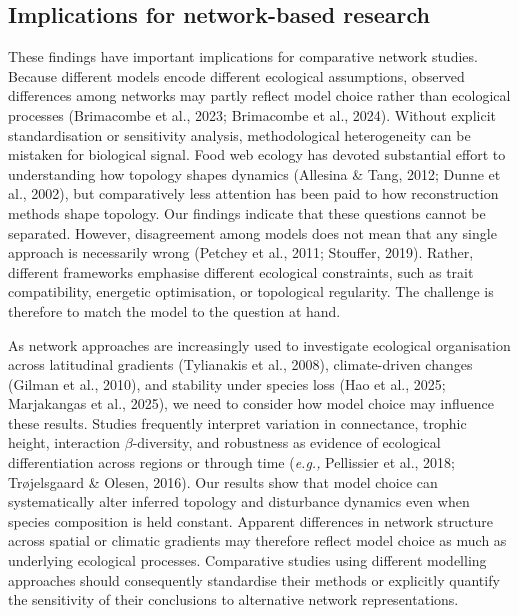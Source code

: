 \documentclass[
]{article}
\begin{document}
\subsection{Implications for network-based
research}\label{implications-for-network-based-research}

These findings have important implications for comparative network
studies. Because different models encode different ecological
assumptions, observed differences among networks may partly reflect
model choice rather than ecological processes (Brimacombe et al., 2023;
Brimacombe et al., 2024). Without explicit standardisation or
sensitivity analysis, methodological heterogeneity can be mistaken for
biological signal. Food web ecology has devoted substantial effort to
understanding how topology shapes dynamics (Allesina \& Tang, 2012;
Dunne et al., 2002), but comparatively less attention has been paid to
how reconstruction methods shape topology. Our findings indicate that
these questions cannot be separated. However, disagreement among models
does not mean that any single approach is necessarily wrong (Petchey et
al., 2011; Stouffer, 2019). Rather, different frameworks emphasise
different ecological constraints, such as trait compatibility, energetic
optimisation, or topological regularity. The challenge is therefore to
match the model to the question at hand.

As network approaches are increasingly used to investigate ecological
organisation across latitudinal gradients (Tylianakis et al., 2008),
climate-driven changes (Gilman et al., 2010), and stability under
species loss (Hao et al., 2025; Marjakangas et al., 2025), we need to
consider how model choice may influence these results. Studies
frequently interpret variation in connectance, trophic height,
interaction \(\beta\)-diversity, and robustness as evidence of
ecological differentiation across regions or through time (\emph{e.g.,}
Pellissier et al., 2018; Trøjelsgaard \& Olesen, 2016). Our results show
that model choice can systematically alter inferred topology and
disturbance dynamics even when species composition is held constant.
Apparent differences in network structure across spatial or climatic
gradients may therefore reflect model choice as much as underlying
ecological processes. Comparative studies using different modelling
approaches should consequently standardise their methods or explicitly
quantify the sensitivity of their conclusions to alternative network
representations.
\end{document}
